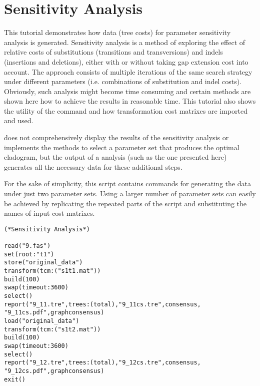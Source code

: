 
\section{Sensitivity Analysis}{\label{tutorial7}}

This tutorial demonstrates how data (tree costs) for parameter sensitivity analysis is generated. Sensitivity analysis 
\cite{wheeler1995} is a method of exploring the effect of relative costs of substitutions (transitions and 
transversions) and indels (insertions and deletions), either with or without taking gap extension cost into 
account. The approach consists of multiple iterations of the same search strategy under different parameters 
(i.e. combinations of substitution and indel costs).  Obviously, such analysis might become time 
consuming and certain methods are shown here how to achieve the results in reasonable time. This tutorial also
 shows the utility of the command  and how transformation cost matrixes are imported and 
 used.

\poy does not comprehensively display the results of the sensitivity analysis or implements the methods to select 
a parameter set that produces the optimal cladogram, but the output of a \poy analysis (such as the one 
presented here) generates all the necessary data for these additional steps.

For the sake of simplicity, this script contains commands for generating the data under just two parameter  sets. 
Using a larger number of parameter sets can easily be achieved by replicating the repeated parts of the script 
and substituting the names of input cost matrixes.

\begin{verbatim}
(*Sensitivity Analysis*)

read("9.fas")
set(root:"t1")
store("original_data")
transform(tcm:("s1t1.mat"))
build(100)
swap(timeout:3600)
select()
report("9_11.tre",trees:(total),"9_11cs.tre",consensus,
"9_11cs.pdf",graphconsensus)
load("original_data")
transform(tcm:("s1t2.mat"))
build(100)
swap(timeout:3600)
select()
report("9_12.tre",trees:(total),"9_12cs.tre",consensus,
"9_12cs.pdf",graphconsensus)
exit()
\end{verbatim}

